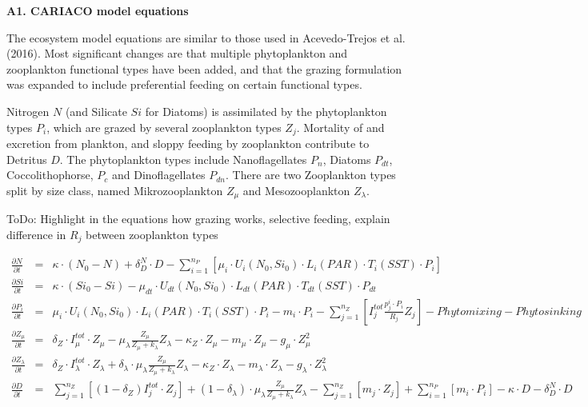 \documentclass[11pt,letterpaper,english]{article}
\begin{document}
\newcommand{\etal}{{\em et al.}}
\newcommand{\ux}{{\underline{x}}}
\newcommand{\tdt}{{t}} 

{\bf {\large A1. CARIACO model equations}}

The ecosystem model equations are similar to those used in Acevedo-Trejos et al. (2016).
Most significant changes are that multiple phytoplankton and zooplankton functional types have been added, and that the grazing formulation was expanded to include preferential feeding on certain functional types.

Nitrogen $N$ (and Silicate $Si$ for Diatoms) is assimilated by the phytoplankton types $P_i$, which are grazed by several zooplankton types $Z_j$. Mortality of and excretion from plankton, and sloppy feeding by zooplankton contribute to Detritus $D$. The phytoplankton types include Nanoflagellates $P_{n}$, Diatoms $P_{dt}$, Coccolithophorse, $P_{c}$ and Dinoflagellates $P_{dn}$. There are two Zooplankton types split by size class, named Mikrozooplankton $Z_{\mu}$ and Mesozooplankton $Z_{\lambda}$.

ToDo:  
Highlight in the equations how grazing works, selective feeding, explain difference in $R_j$ between zooplankton types

\begin{eqnarray}
\frac{\partial N}{\partial t} & = & 
\kappa \cdot \left(N_{0} - N\right) + 
\delta^{N}_{D} \cdot D -
\sum_{i=1}^{n_P} [\mu_i \cdot U_{i}(N_0,Si_0)\cdot L_i(PAR)\cdot T_i(SST) \cdot P_{i}] 
\nonumber  \\
\frac{\partial Si}{\partial t} & = & 
\kappa \cdot \left(Si_{0} - Si\right) 
- \mu_{dt} \cdot U_{dt}(N_0,Si_0) \cdot L_{dt}(PAR)\cdot T_{dt}(SST) \cdot P_{dt}
\nonumber \\
\frac{\partial P_{i}}{\partial t} & = & 
\mu_{i} \cdot U_{i}(N_0,Si_0)\cdot L_{i}(PAR)\cdot T_{i}(SST) \cdot P_{i}
- m_{i} \cdot P_{i}
- \sum_{j=1}^{n_Z} [I^{tot}_j \frac{p^i_{j} \cdot P_{i}} {R_{j}} Z_{j}] -
Phytomixing -
Phytosinking
\nonumber \\
\frac{\partial Z_{\mu}}{\partial t} & = & 
\delta_Z \cdot I^{tot}_{\mu} \cdot Z_{\mu}-
\mu^{}_{\lambda} \frac{Z_{\mu}}{Z_{\mu}+k_{\lambda}} Z_{\lambda}-
\kappa_{Z} \cdot Z_{\mu} -
m_{\mu} \cdot Z_{\mu} - 
g_{\mu} \cdot Z_{\mu}^{2}
\nonumber \\
\frac{\partial Z_{\lambda}}{\partial t} & = & 
\delta_Z \cdot I^{tot}_{\lambda} \cdot Z_{\lambda}+
\delta_{\lambda} \cdot \mu^{}_{\lambda} \frac{Z_{\mu}}{Z_{\mu}+k_{\lambda}} Z_{\lambda}-
\kappa_{Z} \cdot Z_{\lambda} -
m_{\lambda} \cdot Z_{\lambda} - 
g_{\lambda} \cdot Z_{\lambda}^{2}
\nonumber \\
\frac{\partial D}{\partial t} & = & 
\sum_{j=1}^{n_Z} [(1-\delta_Z) I^{tot}_j \cdot Z_{j}] +
(1-\delta_{\lambda}) \cdot \mu^{}_{\lambda} \frac{Z_{\mu}}{Z_{\mu}+k_{\lambda}} Z_{\lambda}-
\sum_{j=1}^{n_Z} [m_j \cdot Z_{j}] +
\sum_{i=1}^{n_P} [m_i \cdot P_{i}] -
\kappa \cdot D -
\delta^{N}_{D} \cdot D
\nonumber
\end{eqnarray}
 
\end{document}
